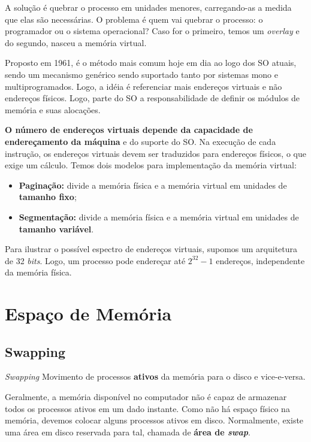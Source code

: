 A solução é quebrar o processo em unidades menores, carregando-as a medida que elas são necessárias. O problema é quem vai quebrar o processo: o programador ou o sistema operacional? Caso for o primeiro, temos um \textit{overlay} e do segundo, nasceu a memória virtual.

Proposto em 1961, é o método mais comum hoje em dia ao logo dos SO atuais, sendo um mecanismo genérico sendo suportado tanto por sistemas mono e multiprogramados. Logo, a idéia é referenciar mais endereços virtuais e não endereços físicos. Logo, parte do SO a responsabilidade de definir os módulos de memória e suas alocações.

\textbf{O número de endereços virtuais depende da capacidade de endereçamento da máquina} e do suporte do SO. Na execução de cada instrução, os endereços virtuais devem ser traduzidos para endereços físicos, o que exige um cálculo. Temos dois modelos para implementação da memória virtual:

\begin{itemize}
  \item \textbf{Paginação:} divide a memória física e a memória virtual em unidades de \textbf{tamanho fixo};

  \item \textbf{Segmentação:} divide a memória física e a memória virtual em unidades de \textbf{tamanho variável}.
\end{itemize}

Para ilustrar o possível espectro de endereços virtuais, supomos um arquitetura de 32 \textit{bits}. Logo, um processo pode endereçar até $2^{32} - 1$ endereços, independente da memória física.





\section{Espaço de Memória}

\subsection{Swapping}
\begin{definicao}{\textit{Swapping}}
  Movimento de processos \textbf{ativos} da memória para o disco e vice-e-versa.
\end{definicao}

Geralmente, a memória disponível no computador não é capaz de armazenar todos os processos ativos em um dado instante. Como não há espaço físico na memória, devemos colocar alguns processos ativos em disco. Normalmente, existe uma área em disco reservada para tal, chamada de \textbf{área de \textit{swap}}.

